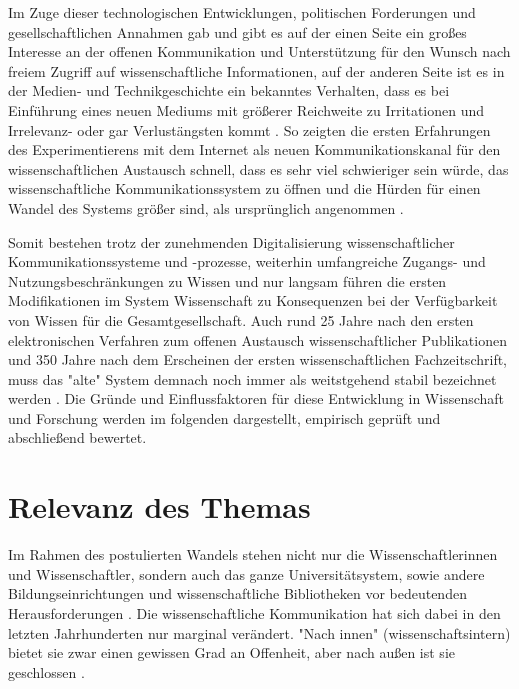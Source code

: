 Im Zuge dieser technologischen Entwicklungen, politischen Forderungen und gesellschaftlichen Annahmen gab und gibt es auf der einen Seite ein großes Interesse an der offenen Kommunikation und Unterstützung für den Wunsch nach freiem Zugriff auf wissenschaftliche Informationen, auf der anderen Seite ist es in der Medien- und Technikgeschichte ein bekanntes Verhalten, dass es bei Einführung eines neuen Mediums mit größerer Reichweite zu Irritationen \cite{naeder_2010_open} und Irrelevanz- oder gar Verlustängsten kommt \cite{hagner_2015_sache_buches}. So zeigten die ersten Erfahrungen des Experimentierens mit dem Internet als neuen Kommunikationskanal für den wissenschaftlichen Austausch schnell, dass es sehr viel schwieriger sein würde, das wissenschaftliche Kommunikationssystem zu öffnen und die Hürden für einen Wandel des Systems größer sind, als ursprünglich angenommen \cite{bjork_2004_open}.

Somit bestehen trotz der zunehmenden Digitalisierung wissenschaftlicher Kommunikationssysteme und -prozesse, weiterhin umfangreiche Zugangs- und Nutzungsbeschränkungen zu Wissen und nur langsam führen die ersten Modifikationen im System Wissenschaft zu Konsequenzen bei der Verfügbarkeit von Wissen für die Gesamtgesellschaft. Auch rund 25 Jahre nach den ersten elektronischen Verfahren zum offenen Austausch wissenschaftlicher Publikationen und 350 Jahre nach dem Erscheinen der ersten wissenschaftlichen Fachzeitschrift, muss das "alte" System demnach noch immer als weitstgehend stabil bezeichnet werden \cite{brembs2015open} \cite{Hanekop_2014}. Die Gründe und Einflussfaktoren für diese Entwicklung in Wissenschaft und Forschung werden im folgenden dargestellt, empirisch geprüft und abschließend bewertet.

\section{Relevanz des Themas}

Im Rahmen des postulierten Wandels stehen nicht nur die Wissenschaftlerinnen und Wissenschaftler, sondern auch das ganze Universitätsystem, sowie andere Bildungseinrichtungen und wissenschaftliche Bibliotheken vor bedeutenden Herausforderungen \cite{muller_2010_open} \cite{Harter2006} \cite{Gu_don_2004} \cite{osterloh2008anreize} \cite{Beverungen_2014}. Die wissenschaftliche Kommunikation hat sich dabei in den letzten Jahrhunderten nur marginal verändert. "Nach innen" (wissenschaftsintern) bietet sie zwar einen gewissen Grad an Offenheit, aber nach außen ist sie geschlossen \cite{kelty_2004}.

